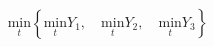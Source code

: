 \documentclass{article}
\begin{document}
\begin{equation}
\underset{t}{\text{min}}
\left\{\underset{t}{\text{min}} Y_1, \quad \underset{t}{\text{min}} Y_2, \quad \underset{t}{\text{min}} Y_3 \right\}
\end{equation}
\end{document}
